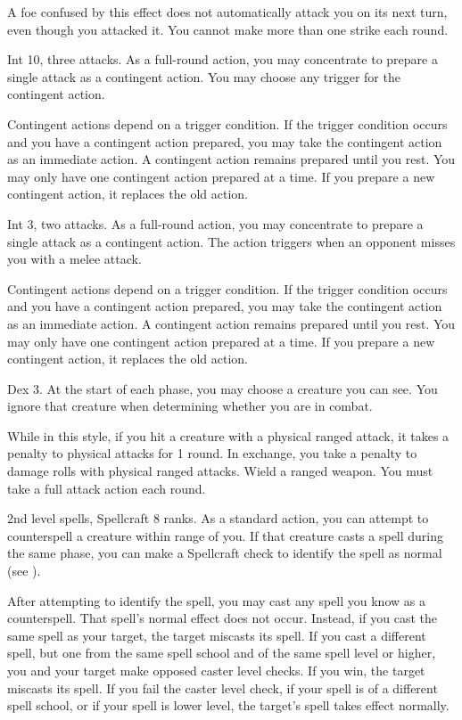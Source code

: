 A foe confused by this effect does not automatically attack you on its next turn, even though you attacked it.
You cannot make more than one strike each round.

\featpre Int 10, three attacks.
\featben As a full-round action, you may concentrate to prepare a single attack as a contingent action.
You may choose any trigger for the contingent action.

Contingent actions depend on a trigger condition.
If the trigger condition occurs and you have a contingent action prepared, you may take the contingent action as an immediate action.
A contingent action remains prepared until you rest.
You may only have one contingent action prepared at a time.
If you prepare a new contingent action, it replaces the old action.

\featpre Int 3, two attacks.
\featben As a full-round action, you may concentrate to prepare a single attack as a contingent action.
The action triggers when an opponent misses you with a melee attack.

Contingent actions depend on a trigger condition.
If the trigger condition occurs and you have a contingent action prepared, you may take the contingent action as an immediate action.
A contingent action remains prepared until you rest.
You may only have one contingent action prepared at a time.
If you prepare a new contingent action, it replaces the old action.

\featpres
Dex 3.
\featben At the start of each phase, you may choose a creature you can see.
You ignore that creature when determining whether you are \engaged in combat.

\featben While in this style, if you hit a creature with a physical ranged attack, it takes a  penalty to physical attacks for 1 round.
In exchange, you take a  penalty to damage rolls with physical ranged attacks.
\stylereq Wield a ranged weapon.
You must take a full attack action each round.

\featpre 2nd level spells, Spellcraft 8 ranks.
\featben As a standard action, you can attempt to counterspell a creature within \rngmed range of you.
If that creature casts a spell during the same phase, you can make a Spellcraft check to identify the spell as normal (see ).

After attempting to identify the spell, you may cast any spell you know as a counterspell.
That spell's normal effect does not occur.
Instead, if you cast the same spell as your target, the target miscasts its spell.
If you cast a different spell, but one from the same spell school and of the same spell level or higher, you and your target make opposed caster level checks.
If you win, the target miscasts its spell.
If you fail the caster level check, if your spell is of a different spell school, or if your spell is lower level, the target's spell takes effect normally.


